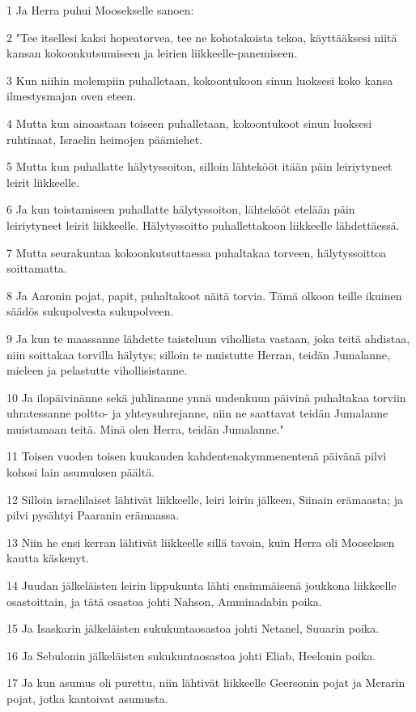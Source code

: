 \par 1 Ja Herra puhui Moosekselle sanoen:
\par 2 "Tee itsellesi kaksi hopeatorvea, tee ne kohotakoista tekoa, käyttääksesi niitä kansan kokoonkutsumiseen ja leirien liikkeelle-panemiseen.
\par 3 Kun niihin molempiin puhalletaan, kokoontukoon sinun luoksesi koko kansa ilmestysmajan oven eteen.
\par 4 Mutta kun ainoastaan toiseen puhalletaan, kokoontukoot sinun luoksesi ruhtinaat, Israelin heimojen päämiehet.
\par 5 Mutta kun puhallatte hälytyssoiton, silloin lähtekööt itään päin leiriytyneet leirit liikkeelle.
\par 6 Ja kun toistamiseen puhallatte hälytyssoiton, lähtekööt etelään päin leiriytyneet leirit liikkeelle. Hälytyssoitto puhallettakoon liikkeelle lähdettäessä.
\par 7 Mutta seurakuntaa kokoonkutsuttaessa puhaltakaa torveen, hälytyssoittoa soittamatta.
\par 8 Ja Aaronin pojat, papit, puhaltakoot näitä torvia. Tämä olkoon teille ikuinen säädös sukupolvesta sukupolveen.
\par 9 Ja kun te maassanne lähdette taisteluun vihollista vastaan, joka teitä ahdistaa, niin soittakaa torvilla hälytys; silloin te muistutte Herran, teidän Jumalanne, mieleen ja pelastutte vihollisistanne.
\par 10 Ja ilopäivinänne sekä juhlinanne ynnä uudenkuun päivinä puhaltakaa torviin uhratessanne poltto- ja yhteysuhrejanne, niin ne saattavat teidän Jumalanne muistamaan teitä. Minä olen Herra, teidän Jumalanne."
\par 11 Toisen vuoden toisen kuukauden kahdentenakymmenentenä päivänä pilvi kohosi lain asumuksen päältä.
\par 12 Silloin israelilaiset lähtivät liikkeelle, leiri leirin jälkeen, Siinain erämaasta; ja pilvi pysähtyi Paaranin erämaassa.
\par 13 Niin he ensi kerran lähtivät liikkeelle sillä tavoin, kuin Herra oli Mooseksen kautta käskenyt.
\par 14 Juudan jälkeläisten leirin lippukunta lähti ensimmäisenä joukkona liikkeelle osastoittain, ja tätä osastoa johti Nahson, Amminadabin poika.
\par 15 Ja Isaskarin jälkeläisten sukukuntaosastoa johti Netanel, Suuarin poika.
\par 16 Ja Sebulonin jälkeläisten sukukuntaosastoa johti Eliab, Heelonin poika.
\par 17 Ja kun asumus oli purettu, niin lähtivät liikkeelle Geersonin pojat ja Merarin pojat, jotka kantoivat asumusta.
